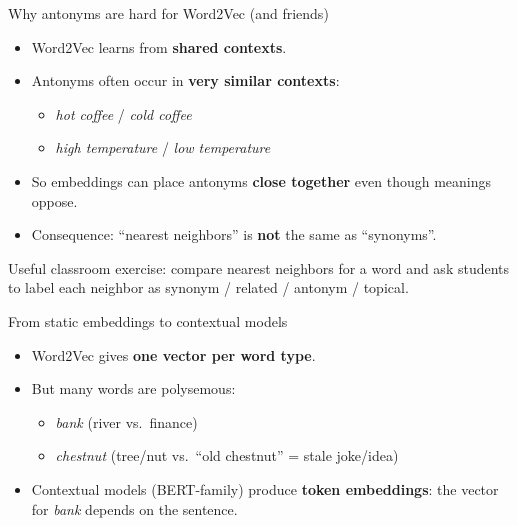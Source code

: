 \documentclass[aspectratio=169]{beamer}
\begin{document}
\begin{frame}{Why antonyms are hard for Word2Vec (and friends)}
\begin{itemize}
  \item Word2Vec learns from \textbf{shared contexts}.
  \item Antonyms often occur in \textbf{very similar contexts}:
    \begin{itemize}
      \item \textit{hot coffee} / \textit{cold coffee}
      \item \textit{high temperature} / \textit{low temperature}
    \end{itemize}
  \item So embeddings can place antonyms \textbf{close together} even though meanings oppose.
  \item Consequence: “nearest neighbors” is \textbf{not} the same as “synonyms”.
\end{itemize}

\vspace{0.5em}
\small
Useful classroom exercise: compare nearest neighbors for a word and ask students to label each neighbor as synonym / related / antonym / topical.
\end{frame}

\begin{frame}{From static embeddings to contextual models}
\begin{itemize}
  \item Word2Vec gives \textbf{one vector per word type}.
  \item But many words are polysemous:
    \begin{itemize}
      \item \textit{bank} (river vs.\ finance)
      \item \textit{chestnut} (tree/nut vs.\ “old chestnut” = stale joke/idea)
    \end{itemize}
  \item Contextual models (BERT-family) produce \textbf{token embeddings}:
    the vector for \textit{bank} depends on the sentence.
\end{itemize}
\end{frame}
\end{document}
